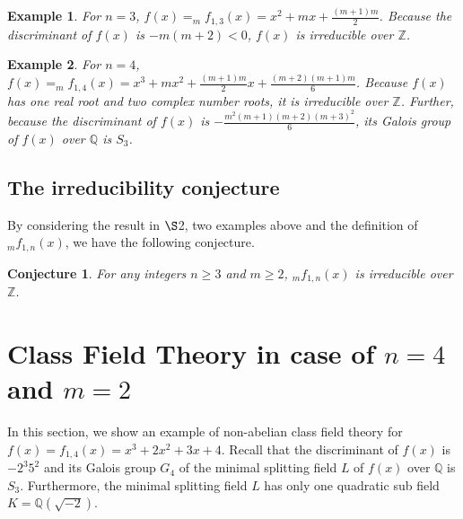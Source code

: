 \documentclass{article}
\newtheorem{exam}{Example}[section]
\newtheorem{conji}{Conjecture}[section]
\begin{document}
\begin{exam}
\upshape
For $n=3$, $f(x) = _{m}f_{1,3}(x) = x^2 + mx + \frac{(m+1)m}{2}$. Because the discriminant of $f(x)$ is $-m(m+2) < 0$, $f(x)$ is irreducible over $\mathbb{Z}$.
\end{exam}

\begin{exam}
\upshape
For $n=4$, $f(x) = _{m}f_{1,4}(x) = x^3 + mx^2 + \frac{(m+1)m}{2}x + \frac{(m+2)(m+1)m}{6}$. Because $f(x)$ has one real root and two complex number roots, it is irreducible over $\mathbb{Z}$. Further, because the discriminant of $f(x)$ is $-\frac{m^{2}(m+1)(m+2)(m+3)^{2}}{6}$, its Galois group of $f(x)$ over $\mathbb{Q}$ is $S_{3}$.
\end{exam}

\subsection{The irreducibility conjecture}
By considering the result in $\S$2, two examples above and the definition of $_{m}f_{1,n}(x)$, we have the following conjecture.

\begin{conji}
\upshape
For any integers $n\geq3$ and $m\geq 2$, $_{m}f_{1,n}(x)$ is irreducible over $\mathbb{Z}$. 
\end{conji}



\section{Class Field Theory in case of $n = 4$ and $m=2$}
In this section, we show an example of non-abelian class field theory for $f(x) = f_{1,4}(x) = x^3 + 2x^2 + 3x +4$. Recall that the discriminant of $f(x)$ is $-2^{3}5^{2}$ and its Galois group $G_{4}$ of the minimal splitting field $L$ of $f(x)$ over $\mathbb{Q}$ is $S_{3}$. Furthermore, the minimal splitting field $L$ has only one quadratic sub field $K = \mathbb{Q}(\sqrt{-2})$.
\end{document}
